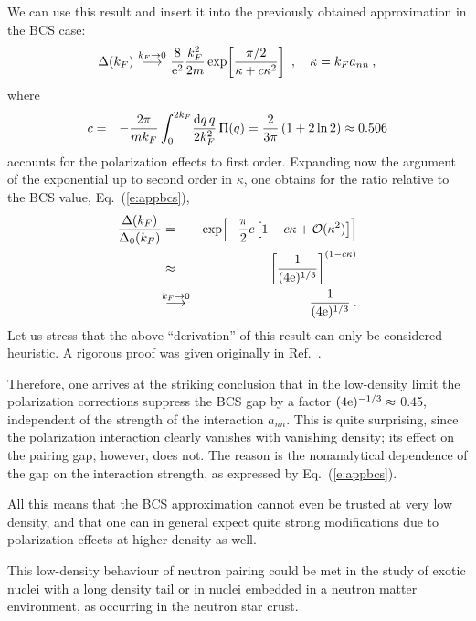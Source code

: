 \documentclass[runningheads]{svmult}
\newcommand{\greeksym}[1]{{\usefont{U}{psy}{m}{n}#1}}
\newcommand{\uPi}{\mbox{\greeksym{P}}}
\def\ra{\rightarrow}
\def\ann{a_{nn}}
\begin{document}
We can use this result and insert it into the previously obtained approximation
in the BCS case:
\begin{eqnarray}
 \Delta(k_F)
 \ {\buildrel k_F\ra 0  \over \longrightarrow}\ 
 {8 \over \E^2} {k_F^2\over 2m} 
 \exp\!\left[ {\pi/2  \over \kappa + c\kappa^2 }\right]
 \ , \quad \kappa = k_F\ann  \:,
\label{e:}
\end{eqnarray}
where 
\begin{eqnarray}
 c &=& -{2\pi\over m k_F} 
 \int_0^{2k_F} \!{\D q\, q\over 2k_F^2} \,\uPi(q) 
 = {2\over3\pi} \left( 1+2\ln 2 \right) \approx 0.506
\end{eqnarray}
accounts for the polarization effects to first order.
Expanding now the argument of the exponential up to second order in $\kappa$,
one obtains for the ratio relative to the BCS value, Eq.~(\ref{e:appbcs}),
\begin{eqnarray}
 { \Delta(k_F) \over \Delta_0(k_F) }
 &=&
 \exp\!\left[ -{\pi\over2}c 
     \left[ 1 - c\kappa + {\cal O}(\kappa^2) \right]
     \right] 
\\
 &\approx&
 \left[ {1 \over (4\E)^{1/3}} \right]^{(1-c\kappa)}
\\
 &{\buildrel k_F\ra 0  \over \longrightarrow}& 
 {1 \over (4\E)^{1/3}} \:.
\label{e:apppol}
\end{eqnarray}
Let us stress that the above ``derivation'' of this result can only be 
considered heuristic. A rigorous proof was given originally 
in Ref.~\cite{GMB}.

Therefore, one arrives at the striking conclusion that in the low-density 
limit the polarization corrections suppress the BCS gap by a 
factor $(4\mathrm{e})^{-1/3}\approx$ 0.45,
independent of the strength of the interaction $\ann$.
This is quite surprising, since the polarization interaction clearly vanishes 
with vanishing density; its effect on the pairing gap, however, does not.
The reason is the nonanalytical dependence of the gap on the interaction
strength, as expressed by Eq.~(\ref{e:appbcs}).

All this means that the BCS approximation cannot even be trusted at 
very low density, and that one can in general expect quite strong 
modifications due to polarization effects at higher density as well.

This low-density behaviour of neutron pairing could be met in the study 
of exotic nuclei with a long density tail or in nuclei embedded in
a neutron matter environment, as occurring in the neutron star crust.
\end{document}
